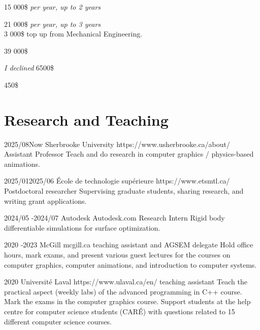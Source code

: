 \documentclass[10pt]{article} %
\begin{document}
{
 15 000\$ \textit{per year, up to 2 years} \\
}

{
 21 000\$ \textit{per year, up to 3 years} \\
 3 000\$ top up from Mechanical Engineering.\\
}

{
\textit{} 39 000\$\\
}

{
\textit{I declined} 6500\$\\
}

{
\textit{} 450\$\\
}


\section{Research and Teaching}
\job
{2025/08}{Now}
{Sherbrooke University}
{https://www.usherbrooke.ca/about/}
{Assistant Professor}
{Teach and do research in computer graphics / physics-based animations.}

\job
{2025/01}{2025/06}
{École de technologie supérieure}
{https://www.etsmtl.ca/}
{Postdoctoral researcher}
{Supervising graduate students, sharing research, and writing grant applications.}

\job
{2024/05 -}{2024/07}
{Autodesk}
{Autodesk.com}
{Research Intern}
{Rigid body differentiable simulations for surface optimization.}

\job
{2020  -}{2023}
{McGill}
{mcgill.ca}
{teaching assistant and AGSEM delegate}
{Hold office hours, mark exams, and present various guest lectures for the courses on computer graphics, computer animations, and introduction to computer systems.}

\job
{}{2020}
{Université Laval}
{https://www.ulaval.ca/en/}
{teaching assistant}
{Teach the practical aspect (weekly labs) of the advanced programming in C++ course. Mark the exams in the computer graphics course. Support students at the help centre for computer science students (CARÉ) with questions related to 15 different computer science courses.}
\end{document}
